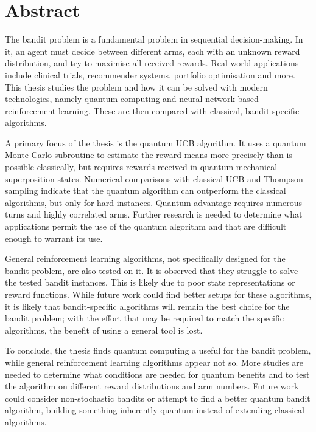 \chapter{Abstract}

The bandit problem is a fundamental problem in sequential decision-making.
In it, an agent must decide between different arms, each with an unknown reward distribution, and try to maximise all received rewards.
Real-world applications include clinical trials, recommender systems, portfolio optimisation and more.
This thesis studies the problem and how it can be solved with modern technologies, namely quantum computing and neural-network-based reinforcement learning.
These are then compared with classical, bandit-specific algorithms.

A primary focus of the thesis is the quantum UCB algorithm.
It uses a quantum Monte Carlo subroutine to estimate the reward means more precisely than is possible classically, but requires rewards received in quantum-mechanical superposition states.
Numerical comparisons with classical UCB and Thompson sampling indicate that the quantum algorithm can outperform the classical algorithms, but only for hard instances.
Quantum advantage requires numerous turns and highly correlated arms.
Further research is needed to determine what applications permit the use of the quantum algorithm and that are difficult enough to warrant its use.

General reinforcement learning algorithms, not specifically designed for the bandit problem, are also tested on it.
It is observed that they struggle to solve the tested bandit instances.
This is likely due to poor state representations or reward functions.
While future work could find better setups for these algorithms, it is likely that bandit-specific algorithms will remain the best choice for the bandit problem; with the effort that may be required to match the specific algorithms, the benefit of using a general tool is lost.

To conclude, the thesis finds quantum computing a useful for the bandit problem, while general reinforcement learning algorithms appear not so.
More studies are needed to determine what conditions are needed for quantum benefits and to test the algorithm on different reward distributions and arm numbers.
Future work could consider non-stochastic bandits or attempt to find a better quantum bandit algorithm, building something inherently quantum instead of extending classical algorithms.

\cleardoublepage
